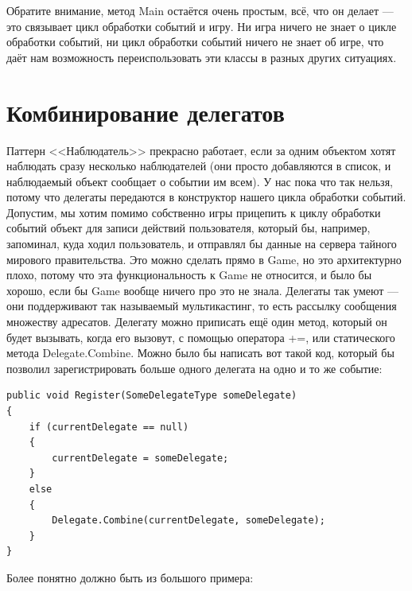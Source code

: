 \documentclass[a5paper]{article}
\begin{document}
Обратите внимание, метод Main остаётся очень простым, всё, что он делает --- это связывает цикл обработки событий и игру. Ни игра ничего не знает о цикле обработки событий, ни цикл обработки событий ничего не знает об игре, что даёт нам возможность переиспользовать эти классы в разных других ситуациях.

\section{Комбинирование делегатов}

Паттерн <<Наблюдатель>> прекрасно работает, если за одним объектом хотят наблюдать сразу несколько наблюдателей (они просто добавляются в список, и наблюдаемый объект сообщает о событии им всем). У нас пока что так нельзя, потому что делегаты передаются в конструктор нашего цикла обработки событий. Допустим, мы хотим помимо собственно игры прицепить к циклу обработки событий объект для записи действий пользователя, который бы, например, запоминал, куда ходил пользователь, и отправлял бы данные на сервера тайного мирового правительства. Это можно сделать прямо в Game, но это архитектурно плохо, потому что эта функциональность к Game не относится, и было бы хорошо, если бы Game вообще ничего про это не знала. Делегаты так умеют --- они поддерживают так называемый мультикастинг, то есть рассылку сообщения множеству адресатов. Делегату можно приписать ещё один метод, который он будет вызывать, когда его вызовут, с помощью оператора +=, или статического метода Delegate.Combine. Можно было бы написать вот такой код, который бы позволил зарегистрировать больше одного делегата на одно и то же событие:

\begin{verbatim}
public void Register(SomeDelegateType someDelegate)
{
    if (currentDelegate == null) 
    {
        currentDelegate = someDelegate;
    }
    else
    {
        Delegate.Combine(currentDelegate, someDelegate);
    }
}
\end{verbatim}

Более понятно должно быть из большого примера:
\end{document}
